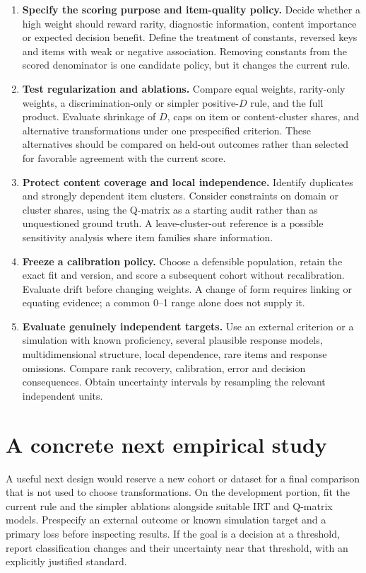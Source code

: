 \documentclass[11pt,a4paper,oneside,headings=normal,parskip=half]{scrreprt}
\begin{document}
\begin{enumerate}
\item \textbf{Specify the scoring purpose and item-quality policy.} Decide whether a high weight should reward rarity, diagnostic information, content importance or expected decision benefit. Define the treatment of constants, reversed keys and items with weak or negative association. Removing constants from the scored denominator is one candidate policy, but it changes the current rule.
\item \textbf{Test regularization and ablations.} Compare equal weights, rarity-only weights, a discrimination-only or simpler positive-$D$ rule, and the full product. Evaluate shrinkage of $D$, caps on item or content-cluster shares, and alternative transformations under one prespecified criterion. These alternatives should be compared on held-out outcomes rather than selected for favorable agreement with the current score.
\item \textbf{Protect content coverage and local independence.} Identify duplicates and strongly dependent item clusters. Consider constraints on domain or cluster shares, using the Q-matrix as a starting audit rather than as unquestioned ground truth. A leave-cluster-out reference is a possible sensitivity analysis where item families share information.
\item \textbf{Freeze a calibration policy.} Choose a defensible population, retain the exact fit and version, and score a subsequent cohort without recalibration. Evaluate drift before changing weights. A change of form requires linking or equating evidence; a common 0--1 range alone does not supply it.
\item \textbf{Evaluate genuinely independent targets.} Use an external criterion or a simulation with known proficiency, several plausible response models, multidimensional structure, local dependence, rare items and response omissions. Compare rank recovery, calibration, error and decision consequences. Obtain uncertainty intervals by resampling the relevant independent units.
\end{enumerate}

\section{A concrete next empirical study}
A useful next design would reserve a new cohort or dataset for a final comparison that is not used to choose transformations. On the development portion, fit the current rule and the simpler ablations alongside suitable IRT and Q-matrix models. Prespecify an external outcome or known simulation target and a primary loss before inspecting results. If the goal is a decision at a threshold, report classification changes and their uncertainty near that threshold, with an explicitly justified standard.
\end{document}
